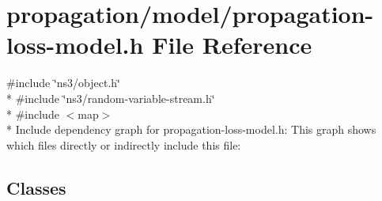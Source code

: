 \hypertarget{propagation-loss-model_8h}{}\section{propagation/model/propagation-\/loss-\/model.h File Reference}
\label{propagation-loss-model_8h}
{\ttfamily \#include \char`\"{}ns3/object.\+h\char`\"{}}\\*
{\ttfamily \#include \char`\"{}ns3/random-\/variable-\/stream.\+h\char`\"{}}\\*
{\ttfamily \#include $<$map$>$}\\*
Include dependency graph for propagation-\/loss-\/model.h\+:
This graph shows which files directly or indirectly include this file\+:
\subsection*{Classes}
